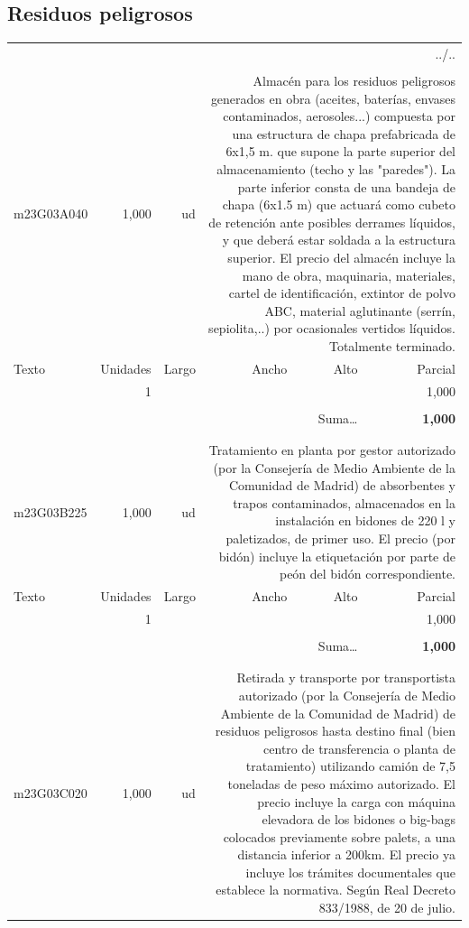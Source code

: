 \documentclass{book}%
\begin{document}
\subsection{Residuos peligrosos}%
\begin{longtable}{lrrrrr}%
\multicolumn{6}{r}{../..}\\%
\endfoot%
\endlastfoot%
&&&&&\\%
m23G03A040&     1,000& ud&\multicolumn{3}{p{6cm}}{\scriptsize Almacén para los residuos peligrosos generados en obra (aceites, baterías, envases contaminados, aerosoles...) compuesta por una estructura de chapa prefabricada de 6x1,5 m. que supone la parte superior del almacenamiento (techo y las "paredes"). La parte inferior consta de una bandeja de chapa (6x1.5 m) que actuará como cubeto de retención ante posibles derrames líquidos, y que deberá estar soldada a la estructura superior. El precio del almacén incluye la mano de obra, maquinaria, materiales, cartel de identificación, extintor de polvo ABC, material aglutinante (serrín, sepiolita,..) por ocasionales vertidos líquidos. Totalmente terminado.\normalsize}\\%
Texto&Unidades&Largo&Ancho&Alto&Parcial\\%
\hline%
\multicolumn{1}{p{3.5cm}}{ }&1&&&&     1,000\\%
&&&&&\\%
\multicolumn{5}{r}{Suma\ldots}&\textbf{     1,000}\\%
\hline%
&&&&&\\%
&&&&&\\%
m23G03B225&     1,000& ud&\multicolumn{3}{p{6cm}}{\scriptsize Tratamiento en planta por gestor autorizado (por la Consejería de Medio Ambiente de la Comunidad de Madrid) de absorbentes y trapos contaminados, almacenados en la instalación en bidones de 220 l y paletizados, de primer uso. El precio (por bidón) incluye la etiquetación por parte de peón del bidón correspondiente.\normalsize}\\%
Texto&Unidades&Largo&Ancho&Alto&Parcial\\%
\hline%
\multicolumn{1}{p{3.5cm}}{ }&1&&&&     1,000\\%
&&&&&\\%
\multicolumn{5}{r}{Suma\ldots}&\textbf{     1,000}\\%
\hline%
&&&&&\\%
&&&&&\\%
m23G03C020&     1,000& ud&\multicolumn{3}{p{6cm}}{\scriptsize Retirada y transporte por transportista autorizado (por la Consejería de Medio Ambiente de la Comunidad de Madrid) de residuos peligrosos hasta destino final (bien centro de transferencia o planta de tratamiento) utilizando camión de 7,5 toneladas de peso máximo autorizado. El precio incluye la carga con máquina elevadora de los bidones o big-bags colocados previamente sobre palets, a una distancia inferior a 200km. El precio ya incluye los trámites documentales que establece la normativa. Según Real Decreto 833/1988, de 20 de julio.\normalsize}\\%

\end{longtable}
\end{document}
